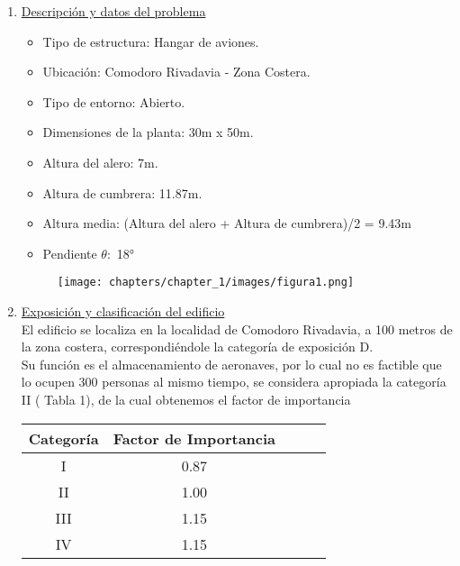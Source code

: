 \begin{enumerate}
\item \underline{Descripción y datos del problema}
\begin{itemize}
\item Tipo de estructura: Hangar de aviones.
\item Ubicación: Comodoro Rivadavia - Zona Costera.
\item Tipo de entorno: Abierto.
\item Dimensiones de la planta: 30m x 50m.
\item Altura del alero: 7m.
\item Altura de cumbrera: 11.87m.
\item Altura media: (Altura del alero + Altura de cumbrera)/2 = 9.43m
\item Pendiente $\theta:$ 18°
\end{itemize}

\begin{figure}[H]
\begin{center}
     \texttt{[image: chapters/chapter\_1/images/figura1.png]}
\end{center}
\end{figure}

\item \underline{Exposición y clasificación del edificio}\\
El edificio se localiza en la localidad de Comodoro Rivadavia, a 100 metros de la zona costera, correspondiéndole la categoría de exposición D.\\
Su función es el almacenamiento de aeronaves, por lo cual no es factible que lo ocupen 300 personas al mismo tiempo, se considera apropiada la categoría II ( Tabla 1), de la cual obtenemos el factor de importancia 

\begin{table}[H]
	\begin{center}
		\begin{tabular}{cclll} \toprule
Categoría & Factor de Importancia\\ \midrule
I & 0.87 \\  \midrule
II & 1.00 \\ \midrule
III & 1.15 \\
IV & 1.15 \\ \bottomrule
		\end{tabular}
    \end{center}
\end{table}


\end{enumerate}
